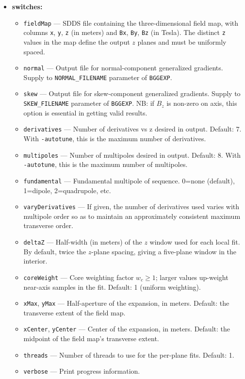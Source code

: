 \documentclass[11pt]{article}
\begin{document}
\begin{itemize}
\item {\bf switches:}
\begin{itemize}
\item {\tt fieldMap} --- SDDS file containing the three-dimensional field map, with columns \verb|x|, \verb|y|,
  \verb|z| (in meters) and \verb|Bx|, \verb|By|, \verb|Bz| (in Tesla). The distinct \verb|z| values in the map
  define the output $z$ planes and must be uniformly spaced.
\item {\tt normal} ---  Output file for normal-component generalized gradients. Supply to \verb|NORMAL_FILENAME|
  parameter of \verb|BGGEXP|.
\item {\tt skew} ---  Output file for skew-component generalized gradients. Supply to \verb|SKEW_FILENAME|
  parameter of \verb|BGGEXP|. NB: if $B_z$ is non-zero on axis, this option is essential in getting
  valid results.
\item {\tt derivatives} --- Number of derivatives vs z desired in output. Default: 7. With \verb|-autotune|,
  this is the maximum number of derivatives.
\item {\tt multipoles} ---  Number of multipoles desired in output. Default: 8. With \verb|-autotune|,
  this is the maximum number of multipoles.
\item {\tt fundamental} --- Fundamental multipole of sequence. 0=none (default), 1=dipole, 2=quadrupole, etc.
\item {\tt varyDerivatives} --- If given, the number of derivatives used varies with multipole order so as to
  maintain an approximately consistent maximum transverse order.
\item {\tt deltaZ} --- Half-width (in meters) of the $z$ window used for each local fit. By default, twice the
  $z$-plane spacing, giving a five-plane window in the interior.
\item {\tt coreWeight} --- Core weighting factor $w_c\ge 1$; larger values up-weight near-axis samples in the
  fit. Default: 1 (uniform weighting).
\item {\tt xMax}, {\tt yMax} --- Half-aperture of the expansion, in meters. Default: the transverse extent of
  the field map.
\item {\tt xCenter}, {\tt yCenter} --- Center of the expansion, in meters. Default: the midpoint of the field
  map's transverse extent.
\item {\tt threads} --- Number of threads to use for the per-plane fits. Default: 1.
\item {\tt verbose} --- Print progress information.

\end{itemize}
\end{itemize}
\end{document}
